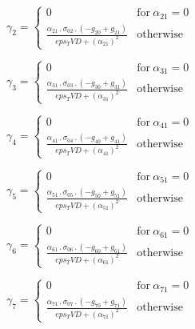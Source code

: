 \documentclass{article}
\begin{document}
\begin{dmath}\gamma_{2} = \begin{cases} 0 & \text{for}\: \alpha_{21} = 0 \\\frac{\alpha_{21} \,.\, \sigma_{0 2} \,.\, \left(- g_{20} + g_{21}\right)}{eps_TVD + \left(\alpha_{21} \right)^{2}} & \text{otherwise} \end{cases}\end{dmath}

\begin{dmath}\gamma_{3} = \begin{cases} 0 & \text{for}\: \alpha_{31} = 0 \\\frac{\alpha_{31} \,.\, \sigma_{0 3} \,.\, \left(- g_{30} + g_{31}\right)}{eps_TVD + \left(\alpha_{31} \right)^{2}} & \text{otherwise} \end{cases}\end{dmath}

\begin{dmath}\gamma_{4} = \begin{cases} 0 & \text{for}\: \alpha_{41} = 0 \\\frac{\alpha_{41} \,.\, \sigma_{0 4} \,.\, \left(- g_{40} + g_{41}\right)}{eps_TVD + \left(\alpha_{41} \right)^{2}} & \text{otherwise} \end{cases}\end{dmath}

\begin{dmath}\gamma_{5} = \begin{cases} 0 & \text{for}\: \alpha_{51} = 0 \\\frac{\alpha_{51} \,.\, \sigma_{0 5} \,.\, \left(- g_{50} + g_{51}\right)}{eps_TVD + \left(\alpha_{51} \right)^{2}} & \text{otherwise} \end{cases}\end{dmath}

\begin{dmath}\gamma_{6} = \begin{cases} 0 & \text{for}\: \alpha_{61} = 0 \\\frac{\alpha_{61} \,.\, \sigma_{0 6} \,.\, \left(- g_{60} + g_{61}\right)}{eps_TVD + \left(\alpha_{61} \right)^{2}} & \text{otherwise} \end{cases}\end{dmath}

\begin{dmath}\gamma_{7} = \begin{cases} 0 & \text{for}\: \alpha_{71} = 0 \\\frac{\alpha_{71} \,.\, \sigma_{0 7} \,.\, \left(- g_{70} + g_{71}\right)}{eps_TVD + \left(\alpha_{71} \right)^{2}} & \text{otherwise} \end{cases}\end{dmath}
\end{document}
